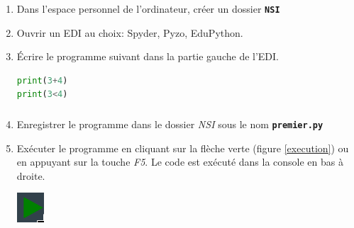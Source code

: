 \documentclass[svgnames,11pt]{beamer}
\begin{document}
\begin{frame}[fragile]
    \frametitle{}

    \begin{activite}
        \begin{enumerate}
            \item Dans l'espace personnel de l'ordinateur, créer un dossier \textbf{\texttt{NSI}}
            \item Ouvrir un EDI au choix: Spyder, Pyzo, EduPython.
            \item Écrire le programme suivant dans la partie gauche de l'EDI.
                  \begin{center}
                      \begin{lstlisting}[language=Python , basicstyle=\ttfamily\small, xleftmargin=2em, xrightmargin=2em]
print(3+4)
print(3<4)
\end{lstlisting}
                  \end{center}

        \end{enumerate}
    \end{activite}

\end{frame}
\begin{frame}
    \frametitle{}
    \setcounter{compteuractivite}{2}

    \begin{activite}
        \begin{enumerate}
            \setcounter{enumi}{3}
            \item Enregistrer le programme dans le dossier \emph{NSI} sous le nom \textbf{\texttt{premier.py}}
            \item Exécuter le programme en cliquant sur la flèche verte (figure \ref{execution}) ou en appuyant sur la touche \emph{F5}. Le code est exécuté dans la console en bas à droite.
                  \begin{center}
                      \centering
                      \includegraphics[width=1cm]{ressources/execution.png}
                      \label{execution}
                  \end{center}
        \end{enumerate}
    \end{activite}

\end{frame}
\end{document}
